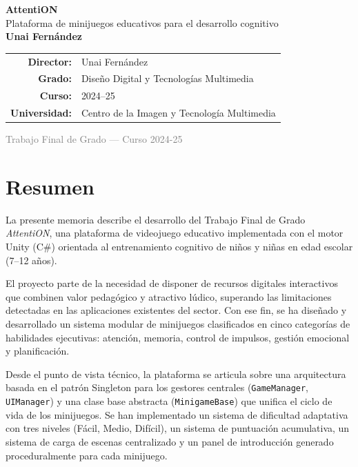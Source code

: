\documentclass[12pt, a4paper]{report}
\begin{document}

\begin{titlepage}
  \centering
  \vspace*{2cm}

  {\Huge\bfseries\color{accentblue} AttentiON}\\[0.5cm]
  {\large Plataforma de minijuegos educativos para el desarrollo cognitivo}\\[2cm]

  {\large\textbf{Unai Fernández}}\\[1.5cm]

  \begin{tabular}{rl}
    \textbf{Director:} & Unai Fernández \\[4pt]
    \textbf{Grado:}    & Diseño Digital y Tecnologías Multimedia \\[4pt]
    \textbf{Curso:}    & 2024--25 \\[4pt]
    \textbf{Universidad:} & Centro de la Imagen y Tecnología Multimedia \\
  \end{tabular}

  \vfill

  {\small\textcolor{gray}{Trabajo Final de Grado — Curso 2024-25}}
\end{titlepage}

\chapter*{Resumen}

La presente memoria describe el desarrollo del Trabajo Final de Grado
\textit{AttentiON}, una plataforma de videojuego educativo implementada con el
motor Unity (C\#) orientada al entrenamiento cognitivo de niños y niñas en
edad escolar (7--12 años).

El proyecto parte de la necesidad de disponer de recursos digitales interactivos
que combinen valor pedagógico y atractivo lúdico, superando las limitaciones
detectadas en las aplicaciones existentes del sector. Con ese fin, se ha diseñado
y desarrollado un sistema modular de minijuegos clasificados en cinco categorías
de habilidades ejecutivas: atención, memoria, control de impulsos, gestión
emocional y planificación.

Desde el punto de vista técnico, la plataforma se articula sobre una arquitectura
basada en el patrón Singleton para los gestores centrales
(\texttt{GameManager}, \texttt{UIManager}) y una clase base abstracta
(\texttt{MinigameBase}) que unifica el ciclo de vida de los minijuegos. Se han
implementado un sistema de dificultad adaptativa con tres niveles (Fácil,
Medio, Difícil), un sistema de puntuación acumulativa, un sistema de carga de
escenas centralizado y un panel de introducción generado proceduralmente para
cada minijuego.
\end{document}
